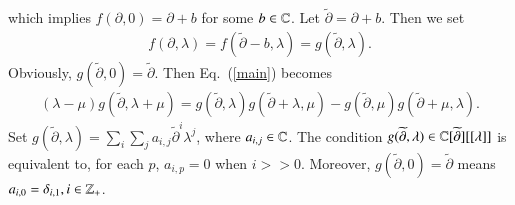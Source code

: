 \documentclass[12pt]{amsart}
\begin{document}
which implies $f(\partial, 0)=\partial+b$ for some $b\in \mathbb{C}$. Let $\widetilde{\partial}=\partial+b$. Then we set
\begin{eqnarray}
f(\partial, \lambda)=f(\widetilde{\partial}-b, \lambda)=g(\widetilde{\partial}, \lambda).
 \end{eqnarray}
 Obviously, $g(\widetilde{\partial}, 0)=\widetilde{\partial}$. Then Eq.~(\ref{main}) becomes
\begin{eqnarray}\label{main-1}
(\lambda-\mu)g(\widetilde{\partial}, \lambda+\mu)=g(\widetilde{\partial},\lambda)g(\widetilde{\partial}+\lambda, \mu)-g(\widetilde{\partial},\mu)g(\widetilde{\partial}+\mu, \lambda).
\end{eqnarray}
Set $g(\widetilde{\partial}, \lambda)=\sum_{i} \sum_ja_{i,j}\widetilde{\partial}^i \lambda^j$, where $a_{i,j}\in \mathbb{C}$.
The condition $g(\widetilde{\partial}, \lambda)\in \mathbb{C}[\widetilde{\partial}][[\lambda]]$ is equivalent to, for each $p$,
$a_{i,p}=0$ when $i>>0$.
Moreover, $g(\widetilde{\partial}, 0)=\widetilde{\partial}$ means $a_{i,0}=\delta_{i,1}, i\in \mathbb{Z}_+$.
\end{document}

